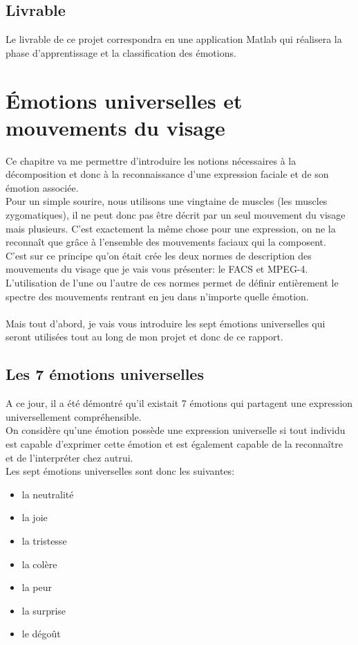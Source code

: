\documentclass[overfullbox, poster]{polytech/polytech}
\begin{document}
\section{Livrable}
Le livrable de ce projet correspondra en une application Matlab qui réalisera la phase d'apprentissage et la classification des émotions.

\chapter{Émotions universelles et mouvements du visage}
\label{chap:chap_emotions}

Ce chapitre va me permettre d'introduire les notions nécessaires à la décomposition et donc à la reconnaissance d'une expression faciale et de son émotion associée.\\
Pour un simple sourire, nous utilisons une vingtaine de muscles (les muscles zygomatiques), il ne peut donc pas être décrit par un seul mouvement du visage mais plusieurs. C'est exactement la même chose pour une expression, on ne la reconnaît que grâce à l'ensemble des mouvements faciaux qui la composent.\\
C'est sur ce principe qu'on était crée les deux normes de description des mouvements du visage que je vais vous présenter: le FACS et MPEG-4.\\
L'utilisation de l'une ou l'autre de ces normes permet de définir entièrement le spectre des mouvements rentrant en jeu dans n'importe quelle émotion.\\
\\
Mais tout d'abord, je vais vous introduire les sept émotions universelles qui seront utilisées tout au long de mon projet et donc de ce rapport.

\newpage
\section{Les 7 émotions universelles}
\label{sec:expr_uni}

A ce jour, il a été démontré qu'il existait 7 émotions qui partagent une expression universellement compréhensible.\\
On considère qu'une émotion possède une expression universelle si tout individu est capable d'exprimer cette émotion et est également capable de la reconnaître et de l'interpréter chez autrui.\\
Les sept émotions universelles sont donc les suivantes:
\begin{itemize}
	\item la neutralité
	\item la joie
	\item la tristesse
	\item la colère
	\item la peur
	\item la surprise
	\item le dégoût
\end{itemize}
\end{document}
